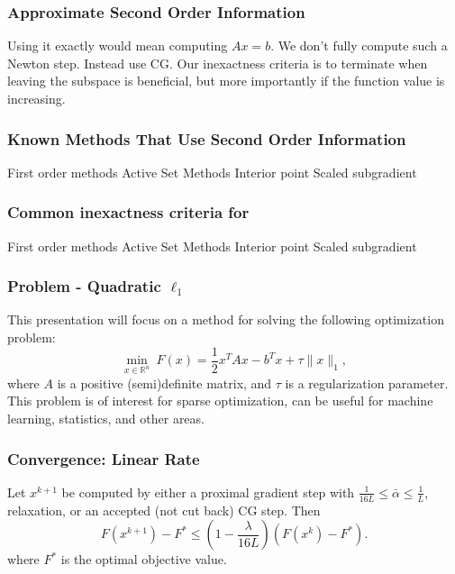 \documentclass{beamer}
\begin{document}
	
	\begin{frame}
		\frametitle{Approximate Second Order Information}
		Using it exactly would mean computing $Ax=b$. 
		We don't fully compute such a Newton step. Instead use CG. 
		Our inexactness criteria is to terminate when leaving the subspace is beneficial, but more importantly if the function value is increasing. 
		\end{frame}
	
	
	\begin{frame}
		\frametitle{Known Methods That Use Second Order Information}
			First order methods
			Active Set Methods
			Interior point
			Scaled subgradient
		\end{frame}
	
	\begin{frame}
		\frametitle{Common inexactness criteria for }
			First order methods
			Active Set Methods
			Interior point
			Scaled subgradient
		\end{frame}
	

	\begin{frame}
		\frametitle{Problem - Quadratic $\ell_1$}
		This presentation will focus on a method for solving the following optimization problem:
		\begin{equation*}
			\min_{x \in \mathbb{R}^n} \ F(x) = \frac{1}{2}x^T A x - b^T x +\tau \|x\|_1 ,
		\end{equation*}
		where $A$ is a positive (semi)definite matrix, and $\tau$ is a regularization parameter.\\
		\pause This problem is of interest for sparse optimization, can be useful for machine learning, statistics, and other areas.
	\end{frame}


	\begin{frame}
	                                            \frametitle{Convergence: Linear Rate}
	\begin{theorem}
	\label{thm:qlinear} 
	Let $x^{k+1}$ be computed by either a proximal gradient step with $\frac{1}{16L} \leq \bar{\alpha} \leq \frac{1}{L}$, relaxation, or an accepted (not cut back) CG step. Then 
	\begin{equation*}
	F(x^{k+1}) - F^* \leq (1-\frac{\lambda}{16 L}) (F(x^k) - F^*).
	  \end{equation*}
	where $F^*$ is the optimal objective value. 
	\end{theorem}
	                                 \end{frame} 
        
\end{document}
